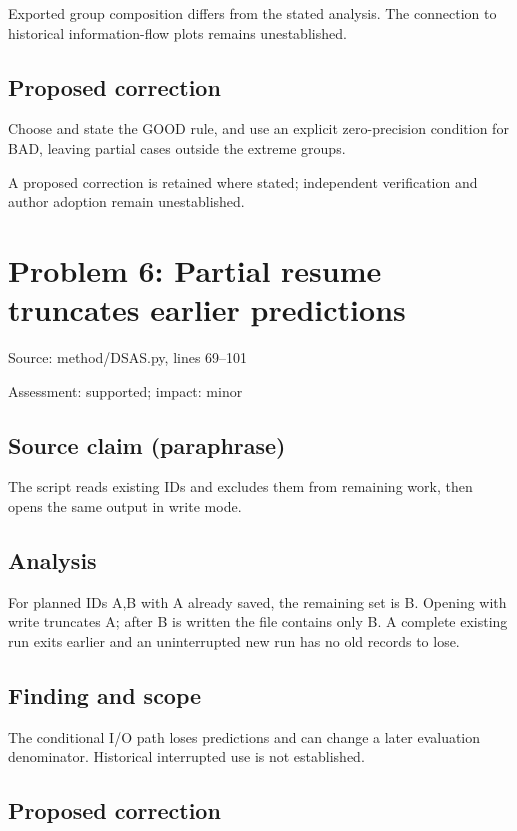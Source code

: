 \documentclass[11pt]{article}
\begin{document}
Exported group composition differs from the stated analysis. The connection to historical information-flow plots remains unestablished.

\subsection*{Proposed correction}

Choose and state the GOOD rule, and use an explicit zero-precision condition for BAD, leaving partial cases outside the extreme groups.

A proposed correction is retained where stated; independent verification and author adoption remain unestablished.

\section*{Problem 6: Partial resume truncates earlier predictions}

Source: method/DSAS.py, lines 69–101

Assessment: supported; impact: minor

\subsection*{Source claim (paraphrase)}

The script reads existing IDs and excludes them from remaining work, then opens the same output in write mode.

\subsection*{Analysis}

For planned IDs A,B with A already saved, the remaining set is B. Opening with write truncates A; after B is written the file contains only B. A complete existing run exits earlier and an uninterrupted new run has no old records to lose.

\subsection*{Finding and scope}

The conditional I/O path loses predictions and can change a later evaluation denominator. Historical interrupted use is not established.

\subsection*{Proposed correction}
\end{document}

